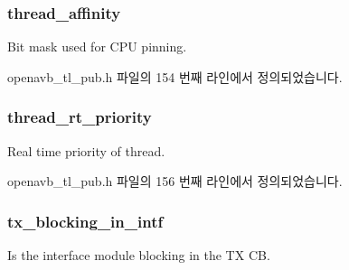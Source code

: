 \subsubsection[{\texorpdfstring{thread\+\_\+affinity}{thread_affinity}}]{ thread\+\_\+affinity}\hypertarget{structopenavb__tl__cfg__t_a1e5d04c7780ba1521971899952932c78}{}\label{structopenavb__tl__cfg__t_a1e5d04c7780ba1521971899952932c78}


Bit mask used for C\+PU pinning. 



openavb\+\_\+tl\+\_\+pub.\+h 파일의 154 번째 라인에서 정의되었습니다.

\subsubsection[{\texorpdfstring{thread\+\_\+rt\+\_\+priority}{thread_rt_priority}}]{ thread\+\_\+rt\+\_\+priority}\hypertarget{structopenavb__tl__cfg__t_a55a9e2a7773c0ac79fecc40b5623a9b8}{}\label{structopenavb__tl__cfg__t_a55a9e2a7773c0ac79fecc40b5623a9b8}


Real time priority of thread. 



openavb\+\_\+tl\+\_\+pub.\+h 파일의 156 번째 라인에서 정의되었습니다.

\subsubsection[{\texorpdfstring{tx\+\_\+blocking\+\_\+in\+\_\+intf}{tx_blocking_in_intf}}]{ tx\+\_\+blocking\+\_\+in\+\_\+intf}\hypertarget{structopenavb__tl__cfg__t_aeb3581dc6183af28e4c61830959f6c86}{}\label{structopenavb__tl__cfg__t_aeb3581dc6183af28e4c61830959f6c86}


Is the interface module blocking in the TX CB. 



